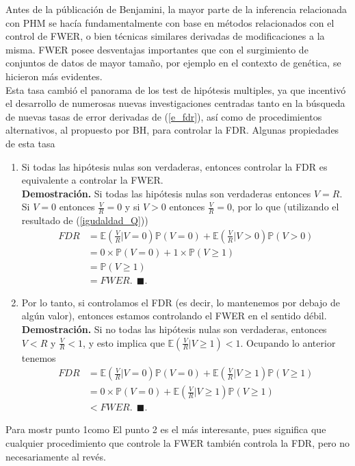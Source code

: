 \documentclass[11pt,letterpaper]{article}
\newcommand{\mP}{\mathbb{P}}
\newcommand{\mE}{\mathbb{E}}
\newcommand{\finf}{\blacksquare.}
\begin{document}
Antes de la públicación de Benjamini, la mayor parte de la inferencia relacionada con PHM se hacía fundamentalmente con base en métodos relacionados con el control de FWER, o bien técnicas similares derivadas de modificaciones a la misma. FWER posee desventajas importantes que con el surgimiento de conjuntos de datos de mayor tamaño, por ejemplo en el contexto de genética, se hicieron más evidentes.\\
Esta tasa cambió el panorama de los test de hipótesis multiples, ya que incentivó el desarrollo de numerosas nuevas investigaciones centradas tanto en la búsqueda de nuevas tasas de error derivadas de (\ref{e_fdr}), así como de procedimientos alternativos, al propuesto por BH, para controlar la FDR. Algunas propiedades de esta tasa 
\begin{enumerate}
\item Si todas las hipótesis nulas son verdaderas, entonces controlar la FDR es equivalente a controlar la FWER. \\
\textbf{Demostración.} Si todas las hipótesis nulas son verdaderas entonces $V=R$. Si $V=0$ entonces $\frac{V}{R}=0$ y si $V>0$ entonces $\frac{V}{R}=0$, por lo que (utilizando el resultado de (\ref{igudaldad_Q}))
\begin{align*}
FDR &= \mE\left( \frac{V}{R}\left| V=0\right. \right)\mP(V=0)+\mE\left( \frac{V}{R}\left| V>0\right. \right)\mP(V>0)\\
&=0\times \mP(V=0)+1\times \mP(V\geq 1)\\
&= \mP(V\geq 1)\\
&= FWER.\ \ \finf
\end{align*}

\item  Por lo tanto, si controlamos el FDR (es decir, lo mantenemos por debajo de algún valor), entonces estamos controlando el FWER en el sentido débil. \\
\textbf{Demostración.} Si no todas las hipótesis nulas son verdaderas, entonces $V<R$ y  $\frac{V}{R}<1$, y esto implica que $\mE\left( \frac{V}{R} |V\geq 1\right)<1$. Ocupando lo anterior tenemos
\begin{align*}
FDR&= \mE\left( \frac{V}{R}\left| V=0\right. \right)\mP(V=0)+\mE\left( \frac{V}{R}\left| V\geq 1\right. \right)\mP(V\geq 1)\\
&=0\times \mP(V=0)+\mE\left( \frac{V}{R}\left| V\geq 1\right. \right)\mP(V\geq 1)\\
&<FWER.\ \ \finf
\end{align*}

\end{enumerate}
Para mostr punto 1como  El punto 2 es el más interesante, pues significa que cualquier procedimiento que controle la FWER también controla la FDR, pero no necesariamente al revés. 
\end{document}
